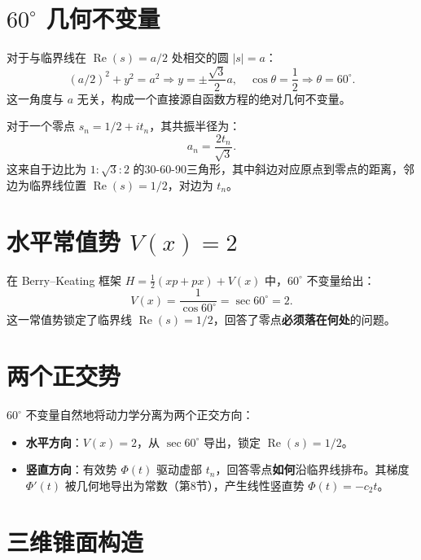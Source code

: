 \documentclass[12pt,a4paper]{article}
\begin{document}
\section{$60^\circ$ 几何不变量}

对于与临界线在 $\operatorname{Re}(s)=a/2$ 处相交的圆 $|s|=a$：
\begin{equation}
(a/2)^2 + y^2 = a^2 \Longrightarrow y = \pm \frac{\sqrt{3}}{2}a, \quad \cos\theta = \frac{1}{2} \Longrightarrow \theta = 60^\circ.
\end{equation}
这一角度与 $a$ 无关，构成一个直接源自函数方程的绝对几何不变量。

对于一个零点 $s_n = 1/2 + i t_n$，其共振半径为：
\begin{equation}
a_n = \frac{2t_n}{\sqrt{3}}.
\end{equation}
这来自于边比为 $1 : \sqrt{3} : 2$ 的30-60-90三角形，其中斜边对应原点到零点的距离，邻边为临界线位置 $\operatorname{Re}(s)=1/2$，对边为 $t_n$。

\section{水平常值势 $V(x)=2$}

在 Berry--Keating 框架 $H = \frac{1}{2}(xp+px) + V(x)$ \cite{berry-keating} 中，$60^\circ$ 不变量给出：
\begin{equation}
V(x) = \frac{1}{\cos 60^\circ} = \sec 60^\circ = 2.
\end{equation}
这一常值势锁定了临界线 $\operatorname{Re}(s)=1/2$，回答了零点\textbf{必须落在何处}的问题。

\section{两个正交势}

$60^\circ$ 不变量自然地将动力学分离为两个正交方向：

\begin{itemize}
\item \textbf{水平方向}：$V(x)=2$，从 $\sec 60^\circ$ 导出，锁定 $\operatorname{Re}(s)=1/2$。
\item \textbf{竖直方向}：有效势 $\Phi(t)$ 驱动虚部 $t_n$，回答零点\textbf{如何}沿临界线排布。其梯度 $\Phi'(t)$ 被几何地导出为常数（第8节），产生线性竖直势 $\Phi(t) = -c_2 t$。
\end{itemize}

\section{三维锥面构造}
\end{document}
